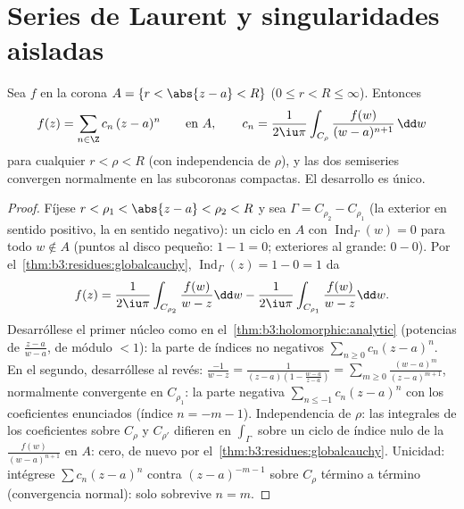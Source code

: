 \section{Series de Laurent y singularidades aisladas}

\begin{theorem}\label{thm:b3:residues:laurent}
Sea $f$  en la corona
$A = \{r < \abs{z - a} <
R\}$ ($0 \leq r < R \leq \infty$). Entonces
\[
f(z) = \sum_{n\in\Z}c_n\,(z - a)^n
\qquad\text{en } A,
\qquad
c_n = \frac1{2\iu\pi}\int_{C_\rho}\frac{f(w)}{(w -
a)^{n+1}}\,\dd w
\]
para cualquier $r < \rho < R$ (con independencia de $\rho$), y las dos
semiseries convergen normalmente en las subcoronas
compactas. El desarrollo es único.
\end{theorem}

\begin{proof}
Fíjese $r < \rho_1 < \abs{z - a} < \rho_2 < R$ y sea $\Gamma =
C_{\rho_2} - C_{\rho_1}$ (la exterior en sentido positivo, la 
en sentido negativo): un ciclo en $A$ con
$\operatorname{Ind}_\Gamma(w) = 0$ para todo $w \notin A$ (puntos
 al disco pequeño: $1 - 1 = 0$; exteriores al grande:
$0 - 0$). Por el~\cref{thm:b3:residues:globalcauchy},
$\operatorname{Ind}_\Gamma(z) = 1 - 0 = 1$ da
\[
f(z) = \frac1{2\iu\pi}\int_{C_{\rho_2}}\frac{f(w)}{w - z}\dd
w - \frac1{2\iu\pi}\int_{C_{\rho_1}}\frac{f(w)}{w - z}\dd w .
\]
Desarróllese el primer núcleo como en
el~\cref{thm:b3:holomorphic:analytic} (potencias de $\frac{z -
a}{w - a}$, de módulo $< 1$): la parte de índices no negativos
$\sum_{n\geq0}c_n(z-a)^n$. En el segundo, desarróllese al revés:
$\frac{-1}{w - z} = \frac1{(z-a)(1 - \frac{w - a}{z -
a})} = \sum_{m\geq0}\frac{(w-a)^m}{(z - a)^{m+1}}$, normalmente
convergente en $C_{\rho_1}$: la parte negativa
$\sum_{n\leq-1}c_n(z-a)^n$ con los coeficientes enunciados (índice
$n = -m-1$). Independencia de $\rho$: las integrales de los coeficientes
sobre $C_{\rho}$ y $C_{\rho'}$ difieren en $\int_\Gamma$ sobre un ciclo
de índice nulo de la 
$\frac{f(w)}{(w-a)^{n+1}}$ en $A$: cero, de nuevo por
el~\cref{thm:b3:residues:globalcauchy}. Unicidad: intégrese
$\sum c_n(z-a)^n$ contra $(z - a)^{-m-1}$ sobre $C_\rho$ término a
término (convergencia normal): solo sobrevive $n = m$.
\end{proof}

